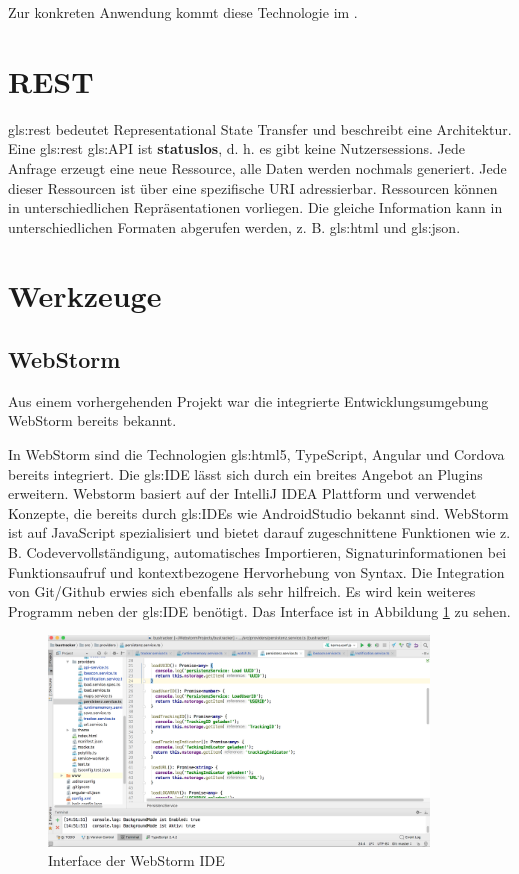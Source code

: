 Zur konkreten Anwendung kommt diese Technologie im . 

\section{REST}
\label{REST}

\gls{gls:rest} bedeutet Representational State Transfer und beschreibt eine Architektur. Eine \gls{gls:rest} \gls{gls:API} ist \textbf{statuslos}, d. h. es gibt keine Nutzersessions. Jede Anfrage erzeugt eine neue Ressource, alle Daten werden nochmals
generiert. Jede dieser Ressourcen ist über eine spezifische URI adressierbar. Ressourcen können in unterschiedlichen Repräsentationen vorliegen. Die gleiche Information kann in unterschiedlichen Formaten abgerufen werden,
z. B. \gls{gls:html} und \gls{gls:json}. 
\cite{Abts2015}

\section{Werkzeuge}

\subsection{WebStorm}
Aus einem vorhergehenden Projekt war die integrierte Entwicklungsumgebung WebStorm bereits bekannt. 
 
In WebStorm sind die Technologien \gls{gls:html}5, TypeScript, Angular und Cordova bereits integriert. Die \gls{gls:IDE} lässt sich durch ein breites Angebot an Plugins erweitern. Webstorm basiert auf der IntelliJ IDEA Plattform und verwendet Konzepte, die bereits durch \glspl{gls:IDE} wie AndroidStudio bekannt sind. 
WebStorm ist auf JavaScript spezialisiert und bietet darauf zugeschnittene Funktionen wie z. B. Codevervollständigung, automatisches Importieren, Signaturinformationen bei Funktionsaufruf und kontextbezogene Hervorhebung von Syntax. Die Integration von Git/Github erwies sich ebenfalls als sehr hilfreich. Es wird kein weiteres Programm neben der \gls{gls:IDE} benötigt.
Das Interface ist in Abbildung \ref{fig:WebStorm} zu sehen.
 
  \begin{figure}[htbp] 
  \centering
     \includegraphics[width=0.9\textwidth]{images/webstorm_weiss.png} 
  \caption{Interface der WebStorm IDE}
  \label{fig:WebStorm}
\end{figure}

